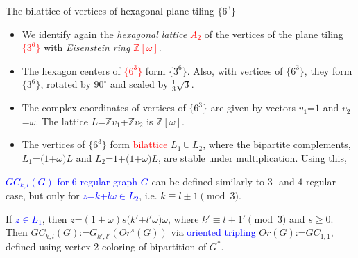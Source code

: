 \documentclass{beamer}
\begin{document}
\begin{frame}{The bilattice of vertices of hexagonal plane tiling 
$\{6^3\}$}
\vspace{-2.5mm}  
\begin{itemize}
\item We  identify again the {\em hexagonal lattice}  \textcolor{red}{$A_2$} 
of the 
vertices of the
plane 
tiling  \textcolor{red}{$\{3^6\}$}
with {\em Eisenstein ring} 
\textcolor{red}{$\mathbb{Z}[\omega]$}.
\item The hexagon centers of
\textcolor{red}{$\{6^3\}$}
form  $\{3^6\}$. Also,
with vertices of $\{6^3\}$, they form $\{3^6\}$, rotated by
 $90^{\circ}$ and scaled by $\frac{1}{3}\sqrt{3}$.



\item The complex coordinates of vertices of $\{6^3\}$ are given by vectors $v_1$=$1$
and $v_2$=$\omega$.
The
lattice $L$=$\mathbb{Z}v_1$+$\mathbb{Z}v_2$ is
$\mathbb{Z}[\omega]$.
\item
The vertices of $\{6^3\}$ form \textcolor{red}{bilattice} $L_1\cup L_2$, 
where
the bipartite complements, $L_1$=$(1$+$\omega )L$ and
$L_2$=$1$+$(1$+$\omega)L$, are stable under multiplication. Using this,
\end{itemize}

\textcolor{blue}{$GC_{k,l}(G)$ for $6$-regular graph $G$}
can be  defined similarly to $3$- and $4$-regular case, but only for \textcolor{blue}{$z$=$k$+$l \omega$$\in$$ L_2$}, i.e. 
$k\equiv l\pm 
1 \pmod3$.

If  \textcolor{blue}{$z\in L_1$},
then $z$=$(1+\omega )s(k'$+$l'\omega) \omega   $, where  
$k'\equiv l\pm 
1' \pmod3$ and $s$$\ge$$ 0$.
 Then 
$GC_{k,l}(G)$:=$G_{k',l'}(Or^s(G))$ via  \textcolor{blue}{oriented tripling} $Or(G)$:=$GC_{1,1}$,
defined using vertex 2-coloring of bipartition of $G^{*}$.



\end{frame}
\end{document}
